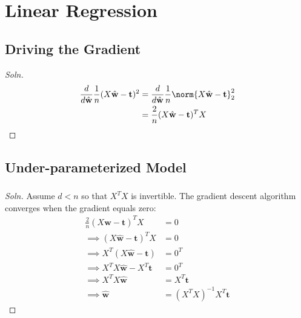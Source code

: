 \documentclass{article}
\begin{document}
	\subsubsection{}

	\section{Linear Regression}
	\subsection{Driving the Gradient}
	\begin{proof}[Soln]
		\begin{align}
			\frac{d}{d\hat{\textbf{w}}} \frac{1}{n} (X \hat{\textbf{w}} - \textbf{t})^2
			&= \frac{d}{d\hat{\textbf{w}}} \frac{1}{n} \norm{X \hat{\textbf{w}} - \textbf{t}}^2_2 \\
			&= \frac{2}{n} (X \hat{\textbf{w}} - \textbf{t})^T X
		\end{align}
	\end{proof}

	\subsection{Under-parameterized Model}
	\subsubsection{}
	\begin{proof}[Soln]
		Assume $d < n$ so that $X^T X$ is invertible. The gradient descent algorithm converges when the gradient equals zero:
		\begin{align}
			\frac{2}{n} (X \hat{\textbf{w}} - \textbf{t})^T X &= 0 \\
			\implies (X \hat{\textbf{w}} - \textbf{t})^T X &= 0 \\
			\implies X^T (X \hat{\textbf{w}} - \textbf{t}) &= 0^T \\
			\implies X^T X \hat{\textbf{w}} - X^T \textbf{t} &= 0^T \\
			\implies X^T X \hat{\textbf{w}} &= X^T \textbf{t} \\
			\implies \hat{\textbf{w}} &= (X^T X)^{-1} X^T \textbf{t}
		\end{align}
	\end{proof}
\end{document}
